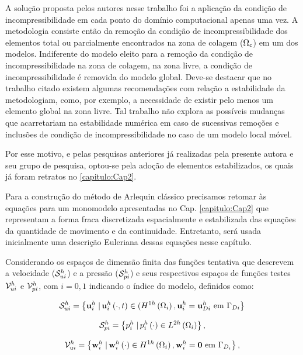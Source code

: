 A solução proposta pelos autores nesse trabalho foi a aplicação da condição de incompressibilidade em cada ponto do domínio computacional apenas uma vez. A metodologia consiste então da remoção da condição de incompressibilidade dos elementos total ou parcialmente encontrados na zona de colagem ($\Omega_c$) em um dos modelos. Indiferente do modelo eleito para a remoção da condição de incompressibilidade na zona de colagem, na zona livre, a condição de incompressibilidade é removida do modelo global. Deve-se destacar que no trabalho citado existem algumas recomendações com relação a estabilidade da metodologiam, como, por exemplo, a necessidade de existir pelo menos um elemento global na zona livre. Tal trabalho não explora as possíveis mudanças que acarretariam na estabilidade numérica em caso de sucessivas remoções e inclusões de condição de incompressibilidade no caso de um modelo local móvel.

Por esse motivo, e pelas pesquisas anteriores já realizadas pela presente autora e seu grupo de pesquisa, optou-se pela adoção de elementos estabilizados, os quais já foram retratos no \autoref{capitulo:Cap2}.

Para a construção do método de Arlequin clássico precisamos retomar às equações para um monomodelo apresentadas no Cap. \ref{capitulo:Cap2} que representam a forma fraca discretizada espacialmente e estabilizada das equações da quantidade de movimento e da continuidade. Entretanto, será usada inicialmente uma descrição Euleriana dessas equações nesse capítulo.

Considerando os espaços de dimensão finita das funções tentativa que descrevem a velocidade ($\mathcal{S}_{ui}^h$) e a pressão ($\mathcal{S}_{pi}^h$) e seus respectivos espaços de funções testes $\mathcal{V}_{ui}^h$ e $\mathcal{V}_{pi}^h$, com $i = 0,1$ indicando o índice do modelo, definidos como:

\begin{align}
	\mathcal{S}_{ui}^h = \left\{\mathbf{u}_{i}^{h} \left . \right| \mathbf{u}_{i}^{h} \left(\cdot,t\right) \in (H^{1h}\left(\Omega_i\right), \mathbf{u}_{i}^{h} = \mathbf{u}_{Di}^{h} \textrm { em}  \ \Gamma_{Di} \right\}
\end{align}

\begin{align}
	\mathcal{S}_{pi}^h = \left\{p_{i}^{h} \left . \right| p_{i}^{h} \left(\cdot\right) \in L^{2h}\left(\Omega_i\right) \right\},
\end{align}

\begin{align}
	\mathcal{V}_{ui}^h = \left\{\mathbf{w}_{i}^{h} \left . \right| \mathbf{w}_{i}^{h} \left(\cdot\right) \in H^{1h}\left(\Omega_i\right), \mathbf{w}_{i}^{h} = \mathbf{0}  \textrm { em} \ \Gamma_{D_i} \right\},
\end{align}

